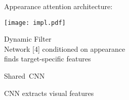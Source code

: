\begin{minipage}{0.3\textwidth}
   \vspace{1em}
   \caption*{\Large Appearance attention architecture:}
   \begin{minipage}[c]{0.5\textwidth}
       \centering
       \texttt{[image: impl.pdf]}
   \end{minipage}\hfill
    \begin{minipage}{0.6\textwidth}
     Dynamic Filter\\ Network [4] conditioned on appearance\\ finds target-specific features
    \end{minipage}
\vspace{.5em}
\end{minipage}
\begin{minipage}{0.3\textwidth}
    \centering
       \begin{minipage}[c]{0.26\textwidth}
         Shared~CNN
    \end{minipage}
    \begin{minipage}[c]{0.71\textwidth}
         CNN extracts visual features
    \end{minipage}
\end{minipage}

\vspace{\baselineskip}